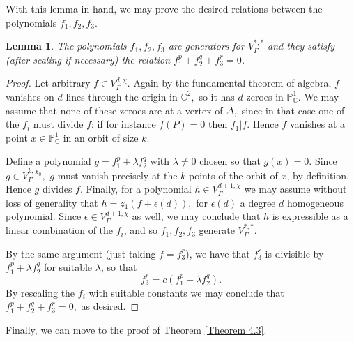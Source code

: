 \documentclass{article}
\newtheorem{lemma}{Lemma}[section]
\begin{document}
With this lemma in hand, we may prove the desired relations between the polynomials $f_1, f_2, f_3$.
\begin{lemma}
\label{4.3}
The polynomials $f_1, f_2, f_3$ are generators for $V_{\Gamma}^{\ast, \ast}$ and they satisfy (after scaling if necessary) the relation $f_1^p + f_2^q + f_3^r = 0$.
\end{lemma}
\begin{proof}
Let arbitrary $f \in V_{\Gamma}^{d, \chi}.$ Again by the fundamental theorem of algebra, $f$ vanishes on $d$ lines through the origin in $\mathbb{C}^2,$ so it has $d$ zeroes in $\mathbb{P}_{\mathbb{C}}^1.$ We may assume that none of these zeroes are at a vertex of $\Delta,$ since in that case one of the $f_i$ must divide $f$: if for instance $f(P) = 0$ then $f_1 | f$. Hence $f$ vanishes at a point $x \in \mathbb{P}_\mathbb{C}^1$ in an orbit of size $k$. 

Define a polynomial $g = f_1^p + \lambda f_2^q$ with $\lambda \neq 0$ chosen so that $g(x) = 0.$ Since $g \in V^{k, \chi_0}_\Gamma,$ $g$ must vanish precisely at the $k$ points of the orbit of $x$, by definition. Hence $g$ divides $f$. Finally, for a polynomial $h \in V^{d+1, \chi}_\Gamma$ we may assume without loss of generality that $h = z_1(f + \epsilon(d)),$ for $\epsilon(d)$ a degree $d$ homogeneous  polynomial. Since $\epsilon \in V^{d+1, \chi}_\Gamma$ as well, we may conclude that $h$ is expressible as a linear combination of the $f_i$, and so $f_1, f_2, f_3$ generate $V_{\Gamma}^{\ast, \ast}$.

By the same argument (just taking $f = f_3^r$), we have that $f_3^r$ is divisible by $f_1^p + \lambda f_2^q$ for suitable $\lambda$, so that $$f_3^r = c(f_1^p + \lambda f_2^q).$$ By rescaling the $f_i$ with suitable constants we may conclude that $f_1^p + f_2^q + f_3^r = 0,$ as desired.

\end{proof}

Finally, we can move to the proof of Theorem \ref{Theorem 4.3}. 
\end{document}
